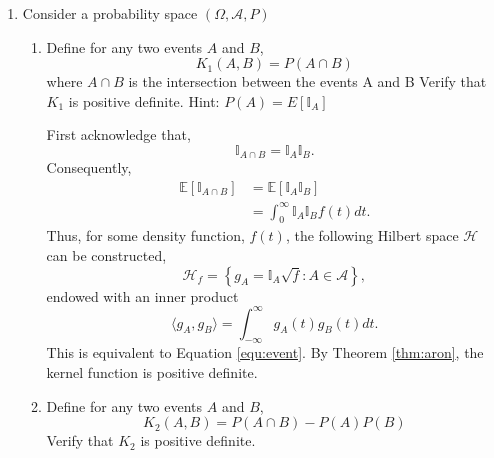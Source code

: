 \documentclass{article}[12pt]
\newtheorem{defn}{Definition}
\begin{document}
\begin{enumerate}
\begin{enumerate}
\begin{defn}{\textbf{Positive Definite Kernel}}
A kernel $k : \mathcal X \times \mathcal X \rightarrow \mathbb R$ is said to be positive definite if for any sequence $a_1,a_2,...,a_m \in \mathbb R$ and $x_1, x_2,...,x_m \in \mathcal X$,
\begin{equation}
\sum_{i=1}^{m} \sum_{i=1}^{m} a_i a_j k(x_i, x_j) \ge 0.
\end{equation}
\label{def:pd}
\end{defn}

Consider the sequence $a_1=1, a_2=-1$ and $x_1=0, x_2=1$,
\begin{equation}
\sum_{i=1}^{2} \sum_{i=1}^{2} a_i a_j k(x_i, x_j) = 0 -1 -1 + 1 = -1 \not \ge 0.
\end{equation}
From Definition \ref{def:pd}, the function $\text{max}(x,y)$ fails the condition, and is not positive definite.
\end{enumerate}
\item Consider a probability space $(\Omega,\mathcal{A},P)$
\begin{enumerate}
\item Define for any two events $A$ and $B$, 
$$K_1(A,B)=P(A \cap B)$$
where $A \cap B$ is the intersection between the events A and B 
Verify that $K_1$ is positive definite. Hint: $P(A)=E[\mathbb{I}_A]$

First acknowledge that,
\begin{equation}
\mathbb I _{A \cap B} = \mathbb{I}_A \mathbb{I}_B.
\end{equation}
Consequently, 
\begin{equation}\label{equ:event}
\begin{aligned} 
\mathbb E \left[ \mathbb I_{A \cap B} \right] &= \mathbb E \left[ \mathbb I_{A} \mathbb I_{B} \right]\\
&= \int_0^\infty \mathbb I_{A} \mathbb I_{B} f(t)
 dt. \end{aligned}
\end{equation}
Thus, for some density function, $f(t)$, the following Hilbert space $\mathcal H$ can be constructed,
\begin{equation}
\mathcal H_f = \left\{g_A = \mathbb I_A \sqrt{f} : A \in \mathcal A \right\},
\end{equation}
endowed with an inner product
\begin{equation}
\langle g_A, g_B\rangle = \int_{-\infty}^{\infty} g_A(t) g_B (t) dt.
\end{equation}
This is equivalent to Equation \ref{equ:event}. By Theorem \ref{thm:aron}, the kernel function is positive definite.


\item Define for any two events $A$ and $B$, 
$$K_2(A,B)=P(A \cap B)-P(A)P(B)$$
Verify that $K_2$ is positive definite. 


\end{enumerate}
\end{enumerate}
\end{document}
